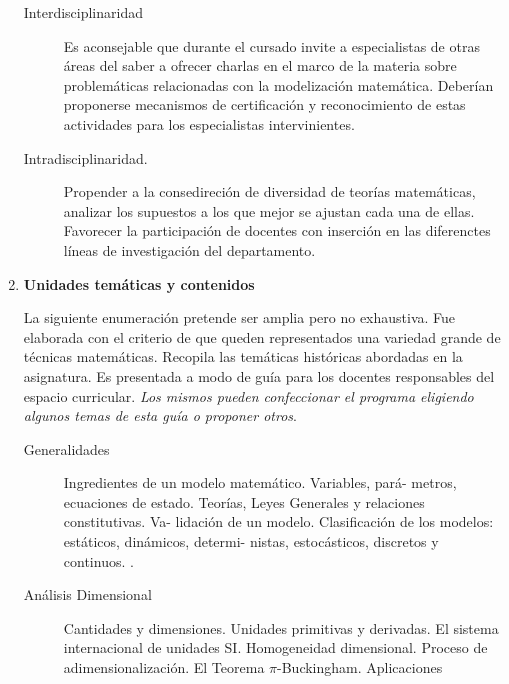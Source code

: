 \documentclass[a4paper,10pt,BCOR10mm,oneside,headsepline]{scrbook}
\begin{document}
\begin{enumerate}
\begin{description}
  
  \item[Interdisciplinaridad] Es aconsejable que durante el cursado invite a especialistas de otras áreas del saber a ofrecer charlas en el marco de la materia sobre problemáticas relacionadas con la modelización matemática. Deberían proponerse mecanismos de certificación y reconocimiento de estas actividades para los especialistas intervinientes.
  
  \item[Intradisciplinaridad.] Propender a la consedireción de diversidad de teorías matemáticas, analizar los supuestos a los que mejor se ajustan cada una de ellas. Favorecer la participación de  docentes con inserción en las diferenctes líneas de investigación del departamento.  


\end{description}

  \item \textbf{Unidades temáticas y contenidos}

  La siguiente enumeración pretende ser amplia pero no exhaustiva. Fue elaborada con el criterio de que queden representados una variedad grande de técnicas matemáticas. Recopila las temáticas históricas abordadas en la asignatura. Es presentada a modo de guía para los docentes responsables del espacio curricular. \emph{Los mismos pueden confeccionar el programa eligiendo algunos temas de esta guía o proponer otros}. 
  
  
  

\begin{description}


\item[Generalidades]  Ingredientes de un modelo matemático. Variables, pará-
metros, ecuaciones de estado. Teorías, Leyes Generales y relaciones constitutivas. Va-
lidación de un modelo. Clasificación de los modelos: estáticos, dinámicos, determi-
nistas, estocásticos, discretos y continuos.  \cite{bellomo1994modelling,SandipBanerjee729,MattiHeilio730}.


\item[Análisis Dimensional] Cantidades y dimensiones.  Unidades primitivas y derivadas. El sistema internacional de unidades SI. Homogeneidad dimensional. Proceso de adimensionalización. El Teorema $\pi$-Buckingham. Aplicaciones
\cite{ThomasWitelski711,MattiHeilio730,MarkH.Holmes706,CliveDym710,EdwardA.Bender715,C.C.Lin720}



\end{description}
\end{enumerate}
\end{document}
